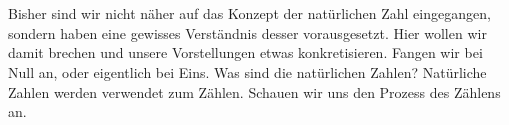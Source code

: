 \documentclass[11pt,a4paper,leqno]{report}
\newtheorem{definition}[theorem]{Definition}
\numberwithin{equation}{chapter}
\begin{document}
\\
\\
Bisher sind wir nicht näher auf das Konzept der natürlichen Zahl eingegangen, sondern haben eine gewisses Verständnis desser vorausgesetzt. Hier wollen wir damit brechen und unsere Vorstellungen etwas konkretisieren.
Fangen wir bei Null an, oder eigentlich bei Eins. Was sind die natürlichen Zahlen? Natürliche Zahlen werden verwendet zum Zählen. Schauen wir uns den Prozess des Zählens an. 
\end{document}
